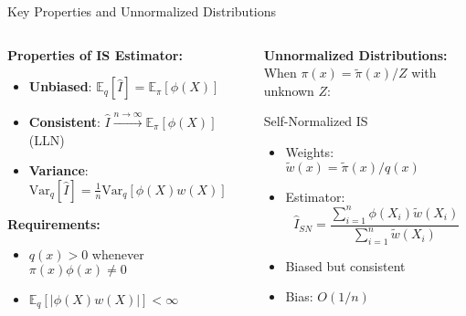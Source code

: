 \begin{frame}{Key Properties and Unnormalized Distributions}
	\begin{columns}
		\begin{column}{0.5\textwidth}
			\textbf{Properties of IS Estimator:}
			\begin{itemize}
				\item \textbf{Unbiased}: $\mathbb{E}_q[\hat{I}] = \mathbb{E}_\pi[\phi(X)]$
				\item \textbf{Consistent}: $\hat{I} \xrightarrow{n\to\infty} \mathbb{E}_\pi[\phi(X)]$ (LLN)
				\item \textbf{Variance}: $\text{Var}_q[\hat{I}] = \frac{1}{n}\text{Var}_q[\phi(X)w(X)]$
			\end{itemize}

			\vspace{0.3cm}
			\textbf{Requirements:}
			\begin{itemize}
				\item $q(x) > 0$ whenever $\pi(x)\phi(x) \neq 0$
				\item $\mathbb{E}_q[|\phi(X)w(X)|] < \infty$
			\end{itemize}
		\end{column}

		\begin{column}{0.5\textwidth}
			\textbf{Unnormalized Distributions:}\\
			When $\pi(x) = \tilde{\pi}(x)/Z$ with unknown $Z$:

			\begin{block}{Self-Normalized IS}
				\begin{itemize}
					\item Weights: $\tilde{w}(x) = \tilde{\pi}(x)/q(x)$
					\item Estimator: $$\hat{I}_{SN} = \frac{\sum_{i=1}^n \phi(X_i)\tilde{w}(X_i)}{\sum_{i=1}^n \tilde{w}(X_i)}$$
					\item Biased but consistent
					\item Bias: $O(1/n)$
				\end{itemize}
			\end{block}
		\end{column}
	\end{columns}
\end{frame}

